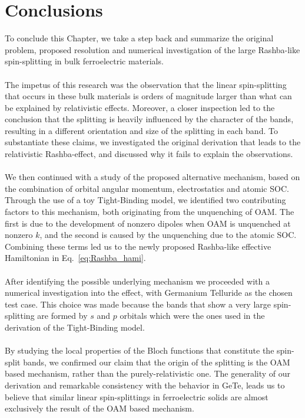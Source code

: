 \section{Conclusions}
To conclude this Chapter, we take a step back and summarize the original problem, proposed resolution and numerical investigation of the large Rashba-like spin-splitting in bulk ferroelectric materials.
\\\\
The impetus of this research was the observation that the linear spin-splitting that occurs in these bulk materials is orders of magnitude larger than what can be explained by relativistic effects.
Moreover, a closer inspection led to the conclusion that the splitting is heavily influenced by the character of the bands, resulting in a different orientation and size of the splitting in each band.
To substantiate these claims, we investigated the original derivation that leads to the relativistic Rashba-effect, and discussed why it fails to explain the observations.
\\\\
We then continued with a study of the proposed alternative mechanism, based on the combination of orbital angular momentum, electrostatics and atomic SOC.
Through the use of a toy Tight-Binding model, we identified two contributing factors to this mechanism, both originating from the unquenching of OAM. The first is due to the development of nonzero dipoles when OAM is unquenched at nonzero $k$, and the second is caused by the unquenching due to the atomic SOC.
Combining these terms led us to the newly proposed Rashba-like effective Hamiltonian in Eq.~\eqref{eq:Rashba_hami}.
\\\\
After identifying the possible underlying mechanism we proceeded with a numerical investigation into the effect, with Germanium Telluride as the chosen test case.
This choice was made because the bands that show a very large spin-splitting are formed by $s$ and $p$ orbitals which were the ones used in the derivation of the Tight-Binding model.
\\\\
By studying the local properties of the Bloch functions that constitute the spin-split bands, we confirmed our claim that the origin of the splitting is the OAM based mechanism, rather than the purely-relativistic one.
The generality of our derivation and remarkable consistency with the behavior in GeTe, leads us to believe that similar linear spin-splittings in ferroelectric solids are almost exclusively the result of the OAM based mechanism.
